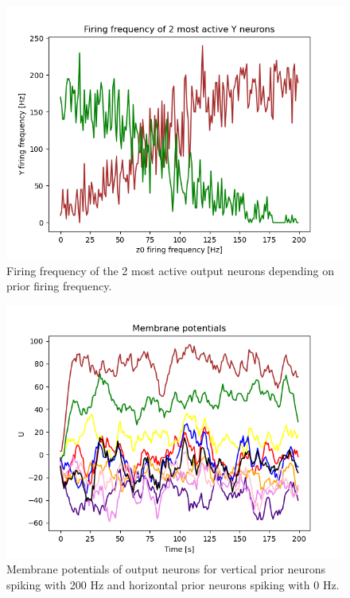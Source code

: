 \begin{figure}
  \includegraphics[width=\linewidth]{figures/horvertAdaptiveInh/YFrequency_prior199.png}
  \caption{ Firing frequency of the 2 most active output neurons depending on prior firing frequency. }
  \label{fig:horvertAdaptiveInhibitionVariablePriorValFrequency}
\end{figure}

\begin{figure}
  \includegraphics[width=\linewidth]{figures/horvertAdaptiveInh/membranePotentials0.png}
  \caption{ Membrane potentials of output neurons for vertical prior neurons spiking with 200 Hz and horizontal prior neurons spiking with 0 Hz. }
  \label{fig:horvertAdaptiveInhibitionVariablePriorValMembranePotentials}
\end{figure}


